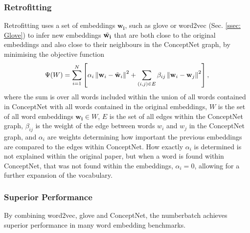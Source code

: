         \subsubsection{Retrofitting}
            Retrofitting uses a set of \glspl{embedding} $\mathbf{w_i}$, such as \gls{glove} or word2vec (Sec. \ref{ssec: Glove}) to infer new \glspl{embedding} $\Tilde{\mathbf{w_i}}$ that are both close to the original \glspl{embedding} and also close to their neighbours in the ConceptNet graph, by minimising the objective function
            \begin{equation}
                \Psi(W)=\sum_{i=1}^{N}\left[\alpha_{i}\left\|\mathbf{w}_{i}-\Tilde{\mathbf{w}}_{i}\right\|^{2}+\sum_{(i, j) \in E} \beta_{i j}\left\|\mathbf{w}_{i}-\mathbf{w}_{j}\right\|^{2}\right],
            \end{equation}
            where the sum is over all words included within the union of all words contained in ConceptNet with all words contained in the original \glspl{embedding}, $W$ is the set of all word \glspl{embedding} $\mathbf{w_i} \in W$, $E$ is the set of all edges within the ConceptNet graph, $\beta_{ij}$ is the weight of the edge between words $w_i$ and $w_j$ in the ConceptNet graph, and $\alpha_i$ are weights determining how important the previous \glspl{embedding} are compared to the edges within ConceptNet. How exactly $\alpha_i$ is determined is not explained within the original paper, but when a word is found within ConceptNet, that was not found within the \glspl{embedding}, $\alpha_i = 0$, allowing for a further expansion of the vocabulary.\cite{speer2017conceptnet}

        \subsubsection{Superior Performance}
            By combining word2vec, \gls{glove} and ConceptNet, the \gls{numberbatch} achieves superior performance in many word \gls{embedding} benchmarks\cite{speer2017conceptnet, conceptnetPerformance}.


